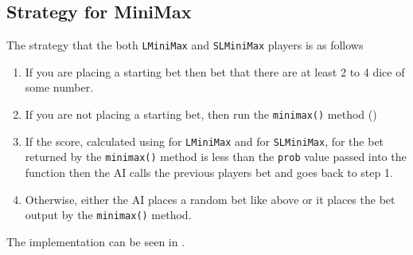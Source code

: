 \subsection{Strategy for MiniMax}

The strategy that the both \texttt{LMiniMax} and \texttt{SLMiniMax} players is as follows
\begin{enumerate}
    \item If you are placing a starting bet then bet that there are at least 2 to 4 dice of some number.
    \item If you are not placing a starting bet, then run the \texttt{minimax()} method ()
    \item If the score, calculated using  for \texttt{LMiniMax} and  for \texttt{SLMiniMax}, for the bet returned by the \texttt{minimax()} method is less than the \texttt{prob} value passed into the function then the AI calls the previous players bet and goes back to step 1.
    \item Otherwise, either the AI places a random bet like above or it places the bet output by the \texttt{minimax()} method.
\end{enumerate}
The implementation can be seen in .
